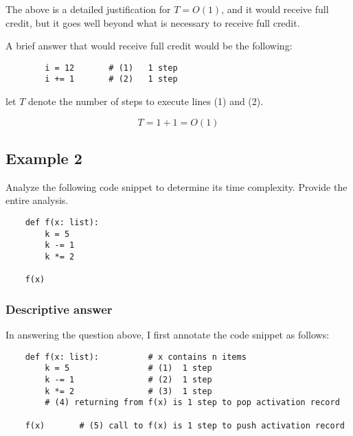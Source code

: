 \documentclass{article}
\begin{document}
\begin{samepage}
  
  The above is a detailed justification for $T=O(1)$, and it would
  receive full credit, but it goes well beyond what is necessary to
  receive full credit.
  
  A brief answer that would receive full credit would be the following:

  \begin{graybox}

    \begin{verbatim}
        i = 12       # (1)   1 step
        i += 1       # (2)   1 step
    \end{verbatim}
    
    let $T$ denote the number of steps to execute lines (1) and (2).
  
    \begin{equation}
      \boxed{T = 1 + 1 = O(1)}
    \end{equation}
  \end{graybox}
 
\end{samepage}


\subsection{Example 2}

Analyze the following code snippet to determine its time complexity.
Provide the entire analysis.

\begin{verbatim}
    def f(x: list): 
        k = 5 
        k -= 1
        k *= 2
        
    f(x) 
\end{verbatim}

\subsubsection{Descriptive answer}

In answering the question above, I first annotate the code snippet
as follows:

\begin{verbatim}
    def f(x: list):          # x contains n items
        k = 5                # (1)  1 step
        k -= 1               # (2)  1 step
        k *= 2               # (3)  1 step
        # (4) returning from f(x) is 1 step to pop activation record
    
    f(x)       # (5) call to f(x) is 1 step to push activation record
\end{verbatim}
\end{document}
